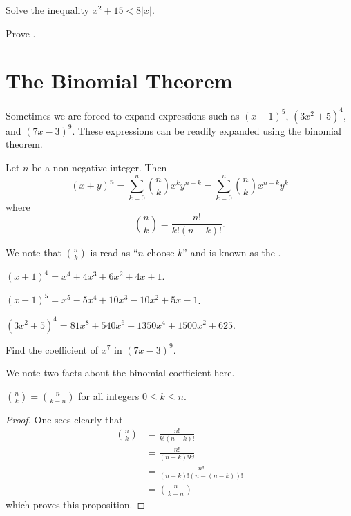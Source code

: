 \begin{exercise}
    Solve the inequality $x^2 + 15 < 8|x|$.
\end{exercise}

\begin{exercise}\label{exercise-triangle-inequality}
    Prove .
\end{exercise}

\section{The Binomial Theorem}
Sometimes we are forced to expand expressions such as $(x-1)^5$, $(3x^2 + 5)^4$, and $(7x - 3)^9$. These expressions can be readily expanded using the binomial theorem.
\begin{theorem}\label{thrm-binomial}
    Let $n$ be a non-negative integer. Then
    \[
        (x+y)^n = \sum_{k=0}^n {n \choose k}x^ky^{n-k} = \sum_{k=0}^n {n \choose k}x^{n-k}y^k
    \]
    where
    \[
        {n \choose k} = \frac{n!}{k!(n-k)!}.
    \]
\end{theorem}
We note that ${n \choose k}$ is read as ``$n$ choose $k$'' and is known as the .

\begin{example}
    $(x+1)^4 = x^4 + 4x^3 + 6x^2 + 4x + 1$.
\end{example}
\begin{example}
    $(x-1)^5 = x^5 - 5x^4 + 10x^3 - 10x^2 + 5x - 1$.
\end{example}
\begin{example}
    $(3x^2 + 5)^4 = 81x^8 + 540x^6 + 1350x^4 + 1500x^2 + 625$.
\end{example}

\begin{exercise}
    Find the coefficient of $x^7$ in $(7x-3)^9$.
\end{exercise}

We note two facts about the binomial coefficient here.
\begin{proposition}
    ${n\choose k} = {n\choose {k-n}}$ for all integers $0 \leq k \leq n$.
\end{proposition}
\begin{proof}
    One sees clearly that
    \begin{align*}
        {n\choose k} &= \frac{n!}{k!(n-k)!}\\
        &= \frac{n!}{(n-k)!k!}\\
        &= \frac{n!}{(n-k)!(n-(n-k))!}\\
        &= {n\choose {k-n}}
    \end{align*}
    which proves this proposition.
\end{proof}


